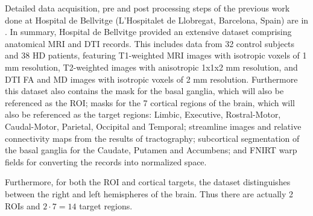 Detailed data acquisition, pre and post processing steps of the previous work done at Hospital de Bellvitge (L'Hospitalet de Llobregat, Barcelona, Spain) are in . In summary, Hospital de Bellvitge provided an extensive dataset comprising anatomical \ac{MRI} and \ac{DTI} records. This includes data from 32 control subjects and 38 \ac{HD} patients, featuring T1-weighted \ac{MRI} images with isotropic voxels of 1 mm resolution, T2-weighted images with anisotropic 1x1x2 mm resolution, and \ac{DTI} \ac{FA} and \ac{MD} images with isotropic voxels of 2 mm resolution. Furthermore this dataset also contains the mask for the basal ganglia, which will also be referenced as the \ac{ROI}; masks for the 7 cortical regions of the brain, which will also be referenced as the target regions: Limbic, Executive, Rostral-Motor, Caudal-Motor, Parietal, Occipital and Temporal; streamline images and relative connectivity maps from the results of tractography; subcortical segmentation of the basal ganglia for the Caudate, Putamen and Accumbens; and \ac{FNIRT} warp fields for converting the records into normalized space.\par
Furthermore, for both the \ac{ROI} and cortical targets, the dataset distinguishes between the right and left hemispheres of the brain. Thus there are actually 2 \ac{ROI}s and $2 \cdot 7=14$ target regions.

